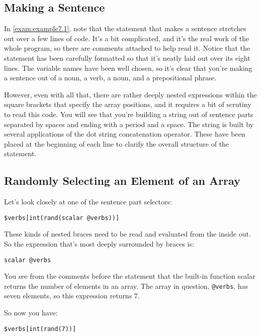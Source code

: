 \subsection{Making a Sentence}
In \autoref{exam:example7.1}, note that the statement that makes a sentence stretches out over a few lines of code. It's a bit complicated, and it's the real work of the whole program, so there are comments attached to help read it. Notice that the statement has been carefully formatted so that it's neatly laid out over its eight lines. The variable names have been well chosen, so it's clear that you're making a sentence out of a noun, a verb, a noun, and a prepositional phrase.

However, even with all that, there are rather deeply nested expressions within the square brackets that specify the array positions, and it requires a bit of scrutiny to read this code. You will see that you're building a string out of sentence parts separated by spaces and ending with a period and a space. The string is built by several applications of the dot string concatenation operator. These have been placed at the beginning of each line to clarify the overall structure of the statement. 

\subsection{Randomly Selecting an Element of an Array}
Let's look closely at one of the sentence part selectors:

\begin{lstlisting}
$verbs[int(rand(scalar @verbs))] 
\end{lstlisting}

These kinds of nested braces need to be read and evaluated from the inside out. So the expression that's most deeply surrounded by braces is:

\begin{lstlisting}
scalar @verbs
\end{lstlisting}

You see from the comments before the statement that the built-in function scalar returns the number of elements in an array. The array in question, \verb|@verbs|, has seven elements, so this expression returns 7.

So now you have:

\begin{lstlisting}
$verbs[int(rand(7))]
\end{lstlisting}

